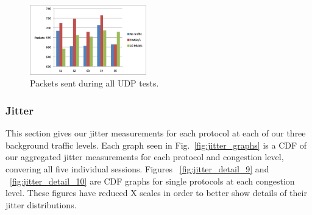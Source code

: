 \begin{figure}[!h]
   \centering
      \includegraphics[width=0.45\textwidth]{pics/udp_sent}
   \caption{Packets sent during all UDP tests.}
\label{fig:udp_sent}
\end{figure}

\subsubsection{Jitter}

This section gives our jitter measurements for each protocol at each of our
three background traffic levels. Each graph seen in Fig.~\ref{fig:jitter_graphs} is a CDF of our aggregated jitter
measurements for each protocol and congestion level, convering all five
individual sessions. Figures ~\ref{fig:jitter_detail_9} and
~\ref{fig:jitter_detail_10} are CDF graphs for single protocols at each
congestion level. These figures have reduced X scales in order to better show
details of their jitter distributions.

